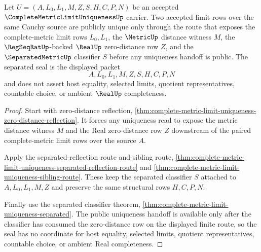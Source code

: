 \begin{theorem}
\label{thm:complete-metric-limit-uniqueness-separated-seal}
Let $U=(A,L_{0},L_{1},M,Z,S,H,C,P,N)$ be an accepted $\CompleteMetricLimitUniquenessUp$ carrier. Two accepted limit rows over the same Cauchy source are publicly unique only through the route that exposes the complete-metric limit rows $L_{0},L_{1}$, the $\MetricUp$ distance witness $M$, the $\RegSeqRatUp$-backed $\RealUp$ zero-distance row $Z$, and the $\SeparatedMetricUp$ classifier $S$ before any uniqueness handoff is public. The separated seal is the displayed packet
$$
A,L_{0},L_{1},M,Z,S,H,C,P,N
$$
and does not assert host equality, selected limits, quotient representatives, countable choice, or ambient $\RealUp$ completeness.
\end{theorem}
\begin{proof}
Start with zero-distance reflection, \autoref{thm:complete-metric-limit-uniqueness-zero-distance-reflection}. It forces any uniqueness read to expose the metric distance witness $M$ and the Real zero-distance row $Z$ downstream of the paired complete-metric limit rows over the source $A$.

Apply the separated-reflection route and sibling route, \autoref{thm:complete-metric-limit-uniqueness-separated-reflection-route} and \autoref{thm:complete-metric-limit-uniqueness-sibling-route}. These keep the separated classifier $S$ attached to $A,L_{0},L_{1},M,Z$ and preserve the same structural rows $H,C,P,N$.

Finally use the separated classifier theorem, \autoref{thm:complete-metric-limit-uniqueness-separated}. The public uniqueness handoff is available only after the classifier has consumed the zero-distance row on the displayed finite route, so the seal has no coordinate for host equality, selected limits, quotient representatives, countable choice, or ambient Real completeness.
\end{proof}

